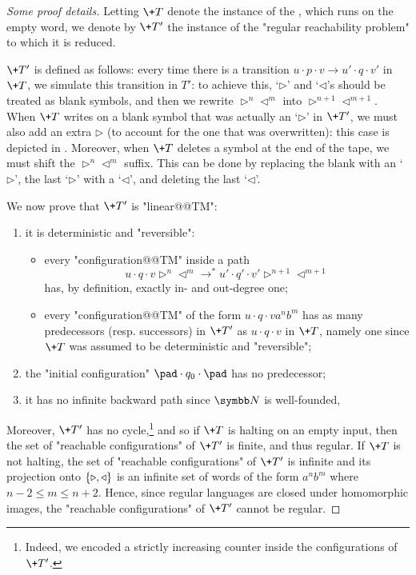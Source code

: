 \begin{proof}[Some proof details]
    Letting $\+T$ denote the instance of the , which runs on the empty word,
    we denote by $\+T'$ the instance of the "regular reachability problem" to which it
    is reduced.

    $\+T'$ is defined as follows: every time there is a transition
    $u\cdot p \cdot v \to u' \cdot q \cdot v'$ in $\+T$,
	we simulate this transition in $T'$: to achieve this, `$\triangleright$' and `$\triangleleft$'s should be treated as blank symbols,
	and then we rewrite $\triangleright^n \triangleleft^m$ into $\triangleright^{n+1}\triangleleft^{m+1}$.
	When $\+T$ writes on a blank symbol that was actually an `$\triangleright$' in $\+T'$,
	we must also add an extra $\triangleright$ (to account for the one that was overwritten):
	this case is depicted in .
	Moreover, when $\+T$ deletes a symbol at the end of the tape,
	we must shift the $\triangleright^n \triangleleft^m$ suffix. This can be done by replacing the blank
	with an `$\triangleright$', the last `$\triangleright$' with a `$\triangleleft$', and deleting the last `$\triangleleft$'.
	
    We now prove that $\+T'$ is "linear@@TM":
    \begin{enumerate}
        \item it is deterministic and "reversible":
        \begin{itemize}
            \item every "configuration@@TM" inside a path
            \[u \cdot q\cdot v \triangleright^{n} \triangleleft^{m} \to^* u' \cdot q' \cdot v' \triangleright^{n+1} \triangleleft^{m+1}\]
            has, by definition, exactly in- and out-degree one;
            \item every "configuration@@TM" of the form $u \cdot q \cdot v a^n b^m$ has as many 
            predecessors (resp. successors) in $\+T'$ as $u \cdot q \cdot v$ in $\+T$, namely one since $\+T$ was assumed to be deterministic and "reversible";
        \end{itemize}
        \item the "initial configuration" $\pad \cdot q_0 \cdot \pad$ has no predecessor;
        \item it has no infinite backward path since $\N$ is well-founded,
    \end{enumerate}
    Moreover, $\+T'$ has no cycle,\footnote{Indeed, we encoded a strictly increasing counter inside the configurations of $\+T'$.} and so if $\+T$ is halting on an empty input, then the set of "reachable configurations" of $\+T'$ is finite, and thus regular. If $\+T$ is not halting, the set of "reachable configurations" of $\+T'$ is infinite and its projection onto $\{\triangleright,\triangleleft\}$ is an infinite set of words of the form $a^{n} b^{m}$ where $n-2 \leq m \leq n+2$. Hence, since regular languages are closed under homomorphic images, the "reachable configurations" of $\+T'$ cannot be regular.
\end{proof}


